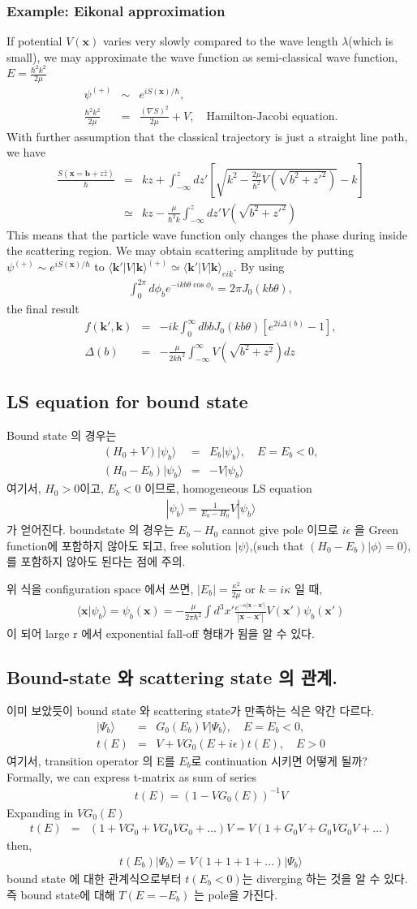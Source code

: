 \documentclass[10pt]{book}
\def\bm{\boldsymbol}
\newcommand{\bea}{\begin{eqnarray}}
\newcommand{\eea}{\end{eqnarray}}
\newcommand{\no}{\nonumber \\}
\def\vk{{\bm k}}
\def\vx{{\bm x}}
\def\la{\langle}
\def\ra{\rangle}
\begin{document}
\subsubsection{Example: Eikonal approximation}
If potential $V(\vx)$ varies very slowly compared to the wave length $\lambda$(which is small),
we may approximate the wave function as semi-classical wave function, $E=\frac{\hbar^2 k^2}{2\mu}$
\bea 
\psi^{(+)}&\sim& e^{i S(\vx)/\hbar}, \no 
\frac{\hbar^2 k^2}{2\mu}&=&\frac{(\nabla S)^2}{2\mu}+V, \quad \mbox{Hamilton-Jacobi equation}. 
\eea 
With further assumption that the classical trajectory is just a straight line path, we have
\bea 
\frac{S(\vx={\bm b}+z\hat{z})}{\hbar}&=& kz+\int_{-\infty}^z d z' \left[\sqrt{k^2-\frac{2\mu}{\hbar^2} V(\sqrt{b^2+z'^2})}-k\right]\no  
      &\simeq & kz -\frac{\mu}{\hbar^2 k}\int_{-\infty}^z d z' V(\sqrt{b^2+z'^2})
\eea 
This means that the particle wave function only changes
the phase during inside the scattering region.
We may obtain scattering amplitude by putting $\psi^{(+)}\sim e^{i S(\vx)/\hbar}$
to $\la \vk'|V|\vk\ra^{(+)}\simeq \la \vk'|V|\vk\ra_{eik}$.
By using 
\bea 
\int_0^{2\pi} d\phi_b e^{-ikb\theta \cos\phi_b }=2\pi J_0(kb\theta),
\eea  
the final result
\bea 
f(\vk',\vk)&=&-ik\int_0^\infty db b J_0(kb\theta)[e^{2i\Delta(b)}-1],\no 
\Delta(b)&=& -\frac{\mu}{2k\hbar^2}\int_{-\infty}^{\infty} V(\sqrt{b^2+z^2}) dz
\eea 


\subsection{LS equation for bound state}
Bound state 의 경우는 
\bea
(H_0+V)|\psi_b\ra&=&E_b|\psi_b\ra, \quad E=E_b<0,\no
(H_0-E_b)|\psi_b\ra&=&-V|\psi_b\ra  
\eea
여기서, $H_0>0$이고, $E_b<0$ 이므로, 
homogeneous LS equation
\bea
|\psi_b\ra=\frac{1}{E_b-H_0}V|\psi_b\ra
\eea
가 얻어진다. boundstate 의 경우는 $E_b-H_0$ cannot give pole 이므로
$i\epsilon$ 을 Green function에 포함하지 않아도 되고,
free solution $|\psi\ra$,(such that $(H_0-E_b)|\phi\ra=0$), 를 
포함하지 않아도 된다는 점에 주의. 

위 식을 configuration space 에서 쓰면, $|E_b|=\frac{\kappa^2}{2\mu}$ or 
$k=i\kappa $ 일 때, 
\bea
\la \vx|\psi_b\ra=\psi_b(\vx)=-\frac{\mu}{2\pi\hbar^2}\int d^3x'
                  \frac{e^{-\kappa|\vx-\vx'|}}{|\vx-\vx'|}V(\vx')\psi_b(\vx') 
\eea
이 되어 large r 에서 exponential fall-off 형태가 됨을 알 수 있다.

\subsection{Bound-state 와 scattering state 의 관계.}
이미 보았듯이 bound state 와 scattering state가 만족하는 식은 약간 다르다.
\bea
|\Psi_b\ra&=&G_0(E_b)V|\Psi_b\ra, \quad E=E_b<0,\no
t(E)&=&V+V G_0(E+i\epsilon) t(E),\quad E>0
\eea
여기서, transition operator 의 E를 $E_b$로 continuation 시키면 어떻게 될까?
Formally, we can express t-matrix as sum of series
\bea
t(E)=(1-V G_0(E))^{-1} V
\eea
Expanding in $VG_0(E)$
\bea
t(E)&=&(1+VG_0+VG_0VG_0+\dots)V=V(1+G_0V+G_0V G_0V+\dots)
\eea
then,
\bea
t(E_b)|\Psi_b\ra=V(1+1+1+\dots)|\Psi_b\ra
\eea
bound state 에 대한  관계식으로부터 $t(E_b<0)$는 diverging 하는 것을
알 수 있다. 즉 bound state에 대해 $T(E=-E_b)$ 는 pole을 가진다.
\end{document}
